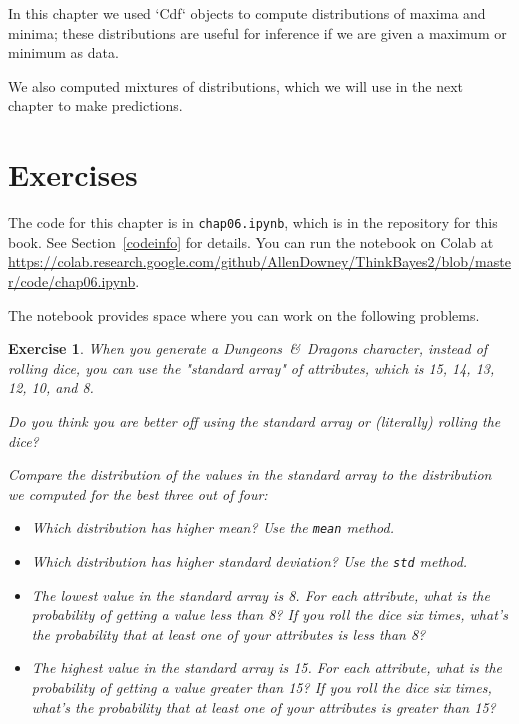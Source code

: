 \documentclass[12pt]{book}
\theoremstyle{exercise}
\newtheorem{exercise}{Exercise}[chapter]
\newcommand{\py}[1]{{\tt #1}}%
\begin{document}
In this chapter we used `Cdf` objects to compute distributions of maxima and minima; these distributions are useful for inference if we are given a maximum or minimum as data.

We also computed mixtures of distributions, which we will use in the next chapter to make predictions.


\section{Exercises}

The code for this chapter is in \py{chap06.ipynb}, which is in the repository for this book.  See Section~\ref{codeinfo} for details.
You can run the notebook on Colab at \url{https://colab.research.google.com/github/AllenDowney/ThinkBayes2/blob/master/code/chap06.ipynb}.

The notebook provides space where you can work on the following problems.


\begin{exercise}
When you generate a {\it Dungeons~\&~Dragons} character, instead of rolling dice, you can use the "standard array" of attributes, which is 15, 14, 13, 12, 10, and 8.

Do you think you are better off using the standard array or (literally) rolling the dice?

Compare the distribution of the values in the standard array to the distribution we computed for the best three out of four:

\begin{itemize}

\item Which distribution has higher mean?  Use the \py{mean} method.

\item Which distribution has higher standard deviation?  Use the \py{std} method.

\item The lowest value in the standard array is 8.  For each attribute, what is the probability of getting a value less than 8?  If you roll the dice six times, what's the probability that at least one of your attributes is less than 8?

\item The highest value in the standard array is 15.  For each attribute, what is the probability of getting a value greater than 15?  If you roll the dice six times, what's the probability that at least one of your attributes is greater than 15?

\end{itemize}

\end{exercise}
\end{document}
